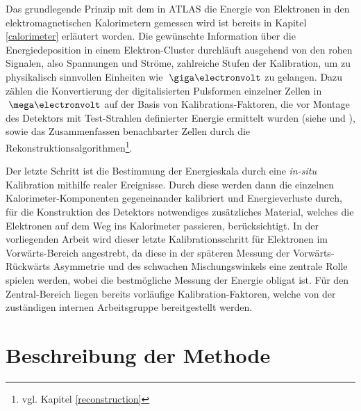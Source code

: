 
Das grundlegende Prinzip mit dem in ATLAS die Energie von Elektronen in den
elektromagnetischen Kalorimetern gemessen wird ist bereits in Kapitel
\ref{calorimeter} erläutert worden. Die gewünschte Information über die
Energiedeposition in einem Elektron-Cluster durchläuft ausgehend von den rohen
Signalen, also Spannungen und Ströme, zahlreiche Stufen der Kalibration, um zu
physikalisch sinnvollen Einheiten wie $\GeV$ zu gelangen. Dazu zählen
die Konvertierung der digitalisierten Pulsformen einzelner Zellen in $\MeV$ auf
der Basis von Kalibrations-Faktoren, die vor Montage des Detektors mit
Test-Strahlen definierter Energie ermittelt wurden (siehe \cite{Aleksa:942528}
und \cite{1748-0221-3-02-P02002}), sowie das Zusammenfassen benachbarter Zellen
durch die Rekonstruktionsalgorithmen\footnote{vgl. Kapitel
\ref{reconstruction}}.

Der letzte Schritt ist die Bestimmung der Energieskala durch eine
\textit{in-situ} Kalibration mithilfe realer Ereignisse. Durch diese werden
dann die einzelnen Kalorimeter-Komponenten gegeneinander kalibriert und
Energieverluste durch, für die Konstruktion des Detektors notwendiges
zusätzliches Material, welches die Elektronen auf dem Weg ins Kalorimeter
passieren, berücksichtigt. In der vorliegenden
Arbeit wird dieser letzte Kalibrationsschritt für Elektronen im
Vorwärts-Bereich angestrebt, da diese in der späteren Messung der
Vorwärts-Rückwärts Asymmetrie und des schwachen Mischungswinkels eine zentrale
Rolle spielen werden, wobei die
bestmögliche Messung der Energie obligat ist. Für den Zentral-Bereich liegen
bereits vorläufige Kalibration-Faktoren, welche von der zuständigen internen
Arbeitsgruppe bereitgestellt werden.



%
\section{Beschreibung der Methode}
\label{energy_calibration:beschreibung_der_methode}

